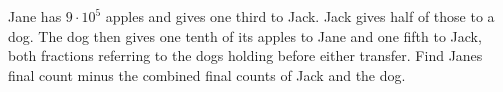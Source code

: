 Jane has $9\cdot10^5$ apples and gives one third to Jack. Jack gives half of those to a dog. The dog then gives one tenth of its apples to Jane and one fifth to Jack, both fractions referring to the dog\textquotesingle s holding before either transfer. Find Jane\textquotesingle s final count minus the combined final counts of Jack and the dog.
